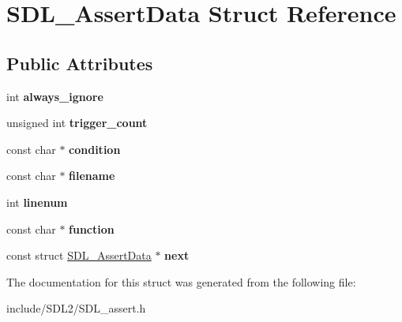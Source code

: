 \hypertarget{struct_s_d_l___assert_data}{}\section{S\+D\+L\+\_\+\+Assert\+Data Struct Reference}
\label{struct_s_d_l___assert_data}
\subsection*{Public Attributes}
\begin{DoxyCompactItemize}
\item 
\mbox{\label{struct_s_d_l___assert_data_a825e1c7772fe24afad33d0afc42cf04c}} 
int {\bfseries always\+\_\+ignore}
\item 
\mbox{\label{struct_s_d_l___assert_data_a230bbcc2d115aab04cf817773e08eb5b}} 
unsigned int {\bfseries trigger\+\_\+count}
\item 
\mbox{\label{struct_s_d_l___assert_data_aec6d372462fa8c94a9d04c1168cd38c9}} 
const char $\ast$ {\bfseries condition}
\item 
\mbox{\label{struct_s_d_l___assert_data_acf27f593e6a436386d2cbcf826cf1ef7}} 
const char $\ast$ {\bfseries filename}
\item 
\mbox{\label{struct_s_d_l___assert_data_ad026d8573970d2402230d5fa3c550b0f}} 
int {\bfseries linenum}
\item 
\mbox{\label{struct_s_d_l___assert_data_a4913c57d4affb813feea82fc5f48a25c}} 
const char $\ast$ {\bfseries function}
\item 
\mbox{\label{struct_s_d_l___assert_data_a2081dcf06dce4df497e423bccddfc099}} 
const struct \hyperlink{struct_s_d_l___assert_data}{S\+D\+L\+\_\+\+Assert\+Data} $\ast$ {\bfseries next}
\end{DoxyCompactItemize}


The documentation for this struct was generated from the following file\+:\begin{DoxyCompactItemize}
\item 
include/\+S\+D\+L2/S\+D\+L\+\_\+assert.\+h\end{DoxyCompactItemize}

